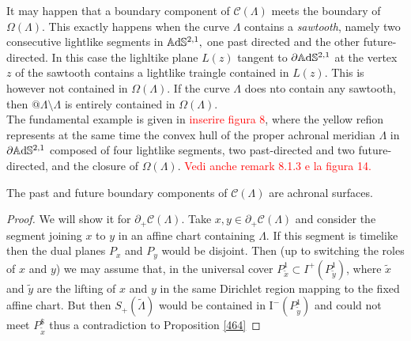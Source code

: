 \begin{observation}\label{465}
    It may happen that a boundary component of $\mathcal{C}(\Lambda)$ meets the boundary of $\Omega(\Lambda)$. This exactly happens when the curve $\Lambda$ contains a \textit{sawtooth}, namely two consecutive lightlike segments in $\mathbb{A}\mathrm{d}\mathbb{S}^{2,1},$ one past directed and the other future-directed. In this case the lighltike plane $L(z)$ tangent to $\partial\mathbb{A}\mathrm{d}\mathbb{S}^{2,1}$ at the vertex $z$ of the sawtooth contains a lightlike traingle contained in $L(z)$. This is however not contained in $\Omega(\Lambda)$. If the curve $\Lambda$ does nto contain any sawtooth, then $@\mathcal{\Lambda}\setminus\Lambda$ is entirely contained in $\Omega(\Lambda)$.\\
    The fundamental example is given in \textcolor{red}{inserire figura 8}, where the yellow refion represents at the same time the convex hull of the proper achronal meridian $\Lambda$ in $\partial\mathbb{A}\mathrm{d}\mathbb{S}^{2,1}$ composed of four lightlike segments, two past-directed and two future-directed, and the closure of $\Omega(\Lambda).$ \textcolor{red}{Vedi anche remark 8.1.3 e la figura 14.} 
\end{observation}

\begin{proposition}\label{466}
The past and future boundary components of $\mathcal{C}(\Lambda)$ are achronal surfaces.
\end{proposition}
\begin{proof}
    We will show it for $\partial_+\mathcal{C}(\Lambda)$. Take $x,y\in\partial_+\mathcal{C}(\Lambda)$ and consider the segment joining $x$ to $y$ in an affine chart containing $\Lambda$. If this segment is timelike then the dual planes $P_x$ and $P_y$ would be disjoint. Then (up to switching the roles of $x$ and $y$) we may assume that, in the universal cover $P_{\widetilde{x}}^1\subset I^+(P_{\widetilde{y}}^1)$, where $\widetilde{x}$ and $\widetilde{y}$ are the lifting of $x$ and $y$ in the same Dirichlet region mapping to the fixed affine chart. But then $S_+(\widetilde{\Lambda})$ would be contained in $\text{I}^-(P_{\widetilde{y}}^1)$ and could not meet $P_{\widetilde{x}}^\$$ thus a contradiction to Proposition \ref{464}
\end{proof}

